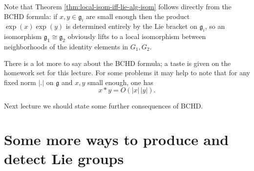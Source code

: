 \documentclass[reqno]{amsart} 
\begin{document}
Note that Theorem \ref{thm:local-isom-iff-lie-alg-isom} follows directly from the BCHD formula: if $x,y \in \mathfrak{g}_i$ are small enough then the product $\exp(x) \exp(y)$ is determined entirely by the Lie bracket on $\mathfrak{g}_i$, so an isomorphism $\mathfrak{g}_1 \cong \mathfrak{g}_2$ obviously lifts to a local isomorphism between neighborhoods of the identity elements in $G_1,G_2$.

There is a lot more to say about the BCHD formula; a taste is given on the homework set for this lecture.  For some problems it may help to note that for any fixed norm $|.|$ on $\mathfrak{g}$ and $x,y$ small enough, one has
\begin{equation*}
  x \ast y = O(|x|\,|y|).
\end{equation*}

Next lecture we should state some further consequences of BCHD.

\section{Some more ways to produce and detect Lie groups}
\label{sec:orgdccc169}
\end{document}
